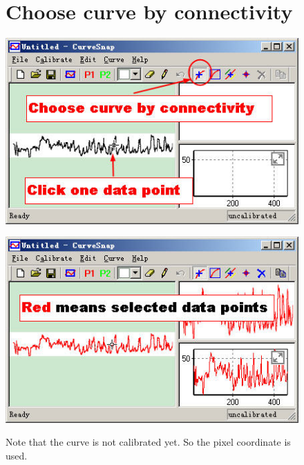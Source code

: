 \documentclass[12pt]{article}
\begin{document}
\begin{figure}[ht!]
\section{Choose curve by connectivity}
  \center \includegraphics{./tut_files/03_choose_by_connectivity.jpg}
\end{figure}

\begin{figure}[ht!]
  \center \includegraphics{./tut_files/04_chosen.jpg}

  Note that the curve is not calibrated yet. So the pixel coordinate is used.
\end{figure}
\end{document}
